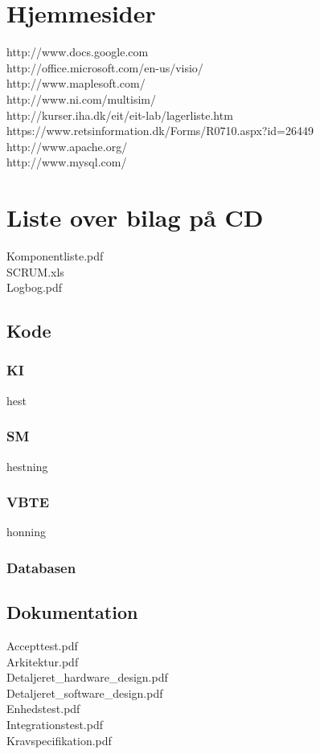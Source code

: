 \section{Hjemmesider}
http://www.docs.google.com\\
http://office.microsoft.com/en-us/visio/\\
http://www.maplesoft.com/\\
http://www.ni.com/multisim/\\
http://kurser.iha.dk/eit/eit-lab/lagerliste.htm\\
https://www.retsinformation.dk/Forms/R0710.aspx?id=26449\\
http://www.apache.org/\\
http://www.mysql.com/\\

\section{Liste over bilag på CD}
Komponentliste.pdf\\
SCRUM.xls\\
Logbog.pdf\\
\subsection{Kode}
\subsubsection{KI}
hest
\subsubsection{SM}
hestning
\subsubsection{VBTE}
honning
\subsubsection{Databasen}
\subsection{Dokumentation}
Accepttest.pdf\\
Arkitektur.pdf\\
Detaljeret\_hardware\_design.pdf\\
Detaljeret\_software\_design.pdf\\
Enhedstest.pdf\\
Integrationstest.pdf\\
Kravspecifikation.pdf\\

